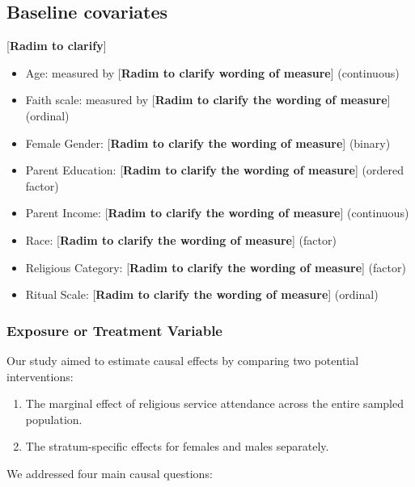 \documentclass[
  single column]{article}
\providecommand{\tightlist}{%
  \setlength{\itemsep}{0pt}\setlength{\parskip}{0pt}}\usepackage{longtable,booktabs,array}
\begin{document}
\subsection{Baseline covariates}\label{baseline-covariates}

{[}\textbf{Radim to clarify}{]}

\begin{itemize}
\tightlist
\item
  Age: measured by {[}\textbf{Radim to clarify wording of measure}{]}
  (continuous)
\item
  Faith scale: measured by {[}\textbf{Radim to clarify the wording of
  measure}{]} (ordinal)
\item
  Female Gender: {[}\textbf{Radim to clarify the wording of measure}{]}
  (binary)
\item
  Parent Education: {[}\textbf{Radim to clarify the wording of
  measure}{]} (ordered factor)
\item
  Parent Income: {[}\textbf{Radim to clarify the wording of measure}{]}
  (continuous)
\item
  Race: {[}\textbf{Radim to clarify the wording of measure}{]} (factor)
\item
  Religious Category: {[}\textbf{Radim to clarify the wording of
  measure}{]} (factor)
\item
  Ritual Scale: {[}\textbf{Radim to clarify the wording of measure}{]}
  (ordinal)
\end{itemize}

\subsubsection{Exposure or Treatment
Variable}\label{exposure-or-treatment-variable}

Our study aimed to estimate causal effects by comparing two potential
interventions:

\begin{enumerate}
\def\labelenumi{\arabic{enumi}.}
\tightlist
\item
  The marginal effect of religious service attendance across the entire
  sampled population.
\item
  The stratum-specific effects for females and males separately.
\end{enumerate}

We addressed four main causal questions:
\end{document}
